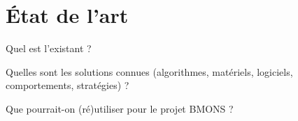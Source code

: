 \chapter{État de l'art}

Quel est l’existant ? 

Quelles sont les solutions connues (algorithmes, matériels, logiciels, comportements, stratégies) ? 

Que pourrait-on (ré)utiliser pour le projet BMONS ?

 